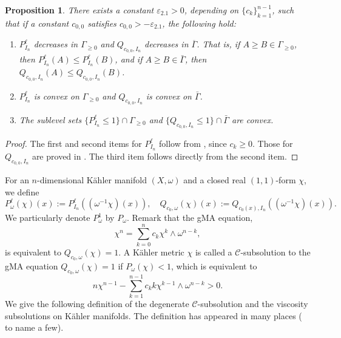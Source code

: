 \documentclass{amsart}
\numberwithin{equation}{section}
\theoremstyle{plain}
\newtheorem{prop}[equation]{Proposition}
\theoremstyle{definition}
\theoremstyle{remark}
\begin{document}
\begin{prop}\label{prop:properties}
    There exists a constant $\varepsilon_{2.1}>0$, depending on $\{c_k\}_{k=1}^{n-1}$, such that if a constant $c_{0,0}$ satisfies $c_{0,0}>-\varepsilon_{2.1}$, the following hold:
    \begin{enumerate}[label={\upshape(\roman*)}]
        \item\label{item:monotonicity} $P^\ell_{I_n}$ decreases in $\Gamma_{\ge0}$ and $Q_{c_{0,0},I_n}$ decreases in $\overline{\Gamma}$. That is, if $A\ge B\in\Gamma_{\ge0}$, then $P^\ell_{I_n}(A)\le P^\ell_{I_n}(B)$, and if $A\ge B\in\bar{\Gamma}$, then $Q_{c_{0,0},I_n}(A)\le Q_{c_{0,0},I_n}(B)$.
        \item $P^\ell_{I_n}$ is convex on $\Gamma_{\ge0}$ and $Q_{c_{0,0},I_n}$ is convex on $\bar{\Gamma}$.
        \item\label{item:sublevel} The sublevel sets $\{P^\ell_{I_n}\le1\}\cap\Gamma_{\ge0}$ and $\{Q_{c_{0,0},I_n}\le1\}\cap\bar{\Gamma}$ are convex.
    \end{enumerate}
\end{prop}

\begin{proof}
    The first and second items for $P^\ell_{I_n}$ follow from \cite[Lemmas 7 and 8]{CS17}, since $c_k\ge0$. Those for $Q_{c_{0,0},I_n}$ are proved in \cite[Lemma 2.2 (3) and (5)]{Datar-Pingali}. The third item follows directly from the second item. 
\end{proof}

For an $n$-dimensional Kähler manifold $(X,\omega)$ and a closed real $(1,1)$-form $\chi$,
we define
\begin{equation}\label{eq:PQ}
    P^\ell_\omega(\chi)(x) := P^\ell_{I_n}((\omega^{-1}\chi)(x)), \quad
Q_{c_0,\omega}(\chi) (x) := Q_{c_0(x),I_n}((\omega^{-1}\chi)(x)).
\end{equation}
We particularly denote $P^1_\omega$ by $P_\omega$.
Remark that the gMA equation,
\begin{equation*}
    \chi^n=\sum_{k=0}^n c_k\chi^k\wedge\omega^{n-k},
\end{equation*}
is equivalent to $Q_{c_0,\omega}(\chi)=1$.
A Kähler metric $\chi$ is called a $\mathcal{C}$-subsolution to the gMA equation $Q_{c_0,\omega}(\chi)=1$ if $P_{\omega}(\chi)<1$, which is equivalent to
\begin{equation*}
    n\chi^{n-1}-\sum_{k=1}^{n-1}c_k k\chi^{k-1}\wedge\omega^{n-k}>0.
\end{equation*}
We give the following definition of the degenerate $\mathcal{C}$-subsolution and the viscosity subsolutions on K{\"a}hler manifolds.
The definition has appeared in many places (\cite{EGZ,CS17,DDT,CX25a,CX25b} to name a few).
\end{document}
